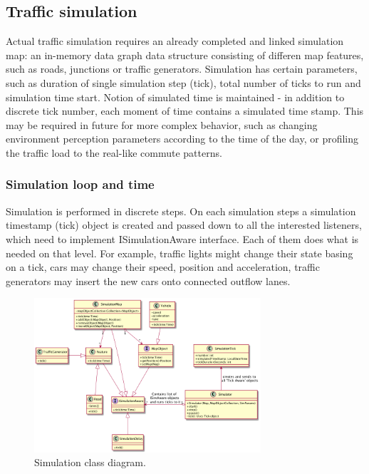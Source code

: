 \subsection{Traffic simulation}
Actual traffic simulation requires an already completed and linked simulation map: an in-memory data graph data structure consisting of differen map features, such as roads, junctions or traffic generators. Simulation has certain parameters, such as duration of single simulation step (tick), total number of ticks to run and simulation time start. Notion of simulated time is maintained - in addition to discrete tick number, each moment of time contains a simulated time stamp. This may be required in future for more complex behavior, such as changing environment perception parameters according to the time of the day, or profiling the traffic load to the real-like commute patterns.

\subsubsection{Simulation loop and time}
Simulation is performed in discrete steps. On each simulation steps a simulation timestamp (tick) object is created and passed down to all the interested listeners, which need to implement ISimulationAware interface. Each of them does what is needed on that level. For example, traffic lights might change their state basing on a tick, cars may change their speed, position and acceleration, traffic generators may insert the new cars onto connected outflow lanes.

\begin{figure}[h]
    \vspace{1.5em}
    \caption{Simulation class diagram.}
    \label{fig:simulationClassDiagram}
    \centering
    \includegraphics[width=0.75\textwidth]{../../uml_diagrams/simulatorClassDiagram.png}
\end{figure}

